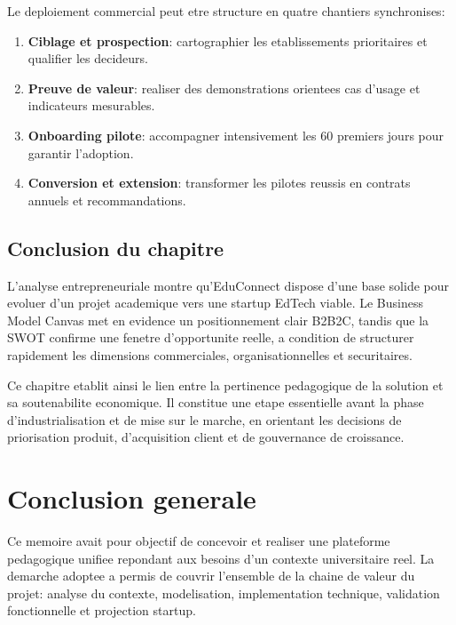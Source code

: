 ﻿\documentclass[12pt,a4paper,oneside]{report}
\begin{document}
Le deploiement commercial peut etre structure en quatre chantiers synchronises:
\begin{enumerate}
  \item \textbf{Ciblage et prospection}: cartographier les etablissements prioritaires et qualifier les decideurs.
  \item \textbf{Preuve de valeur}: realiser des demonstrations orientees cas d'usage et indicateurs mesurables.
  \item \textbf{Onboarding pilote}: accompagner intensivement les 60 premiers jours pour garantir l'adoption.
  \item \textbf{Conversion et extension}: transformer les pilotes reussis en contrats annuels et recommandations.
\end{enumerate}

\section{Conclusion du chapitre}

L'analyse entrepreneuriale montre qu'EduConnect dispose d'une base solide pour evoluer d'un projet academique vers une startup EdTech viable. Le Business Model Canvas met en evidence un positionnement clair B2B2C, tandis que la SWOT confirme une fenetre d'opportunite reelle, a condition de structurer rapidement les dimensions commerciales, organisationnelles et securitaires.

Ce chapitre etablit ainsi le lien entre la pertinence pedagogique de la solution et sa soutenabilite economique. Il constitue une etape essentielle avant la phase d'industrialisation et de mise sur le marche, en orientant les decisions de priorisation produit, d'acquisition client et de gouvernance de croissance.


\chapter*{Conclusion generale}

Ce memoire avait pour objectif de concevoir et realiser une plateforme pedagogique unifiee repondant aux besoins d'un contexte universitaire reel. La demarche adoptee a permis de couvrir l'ensemble de la chaine de valeur du projet: analyse du contexte, modelisation, implementation technique, validation fonctionnelle et projection startup.
\end{document}

